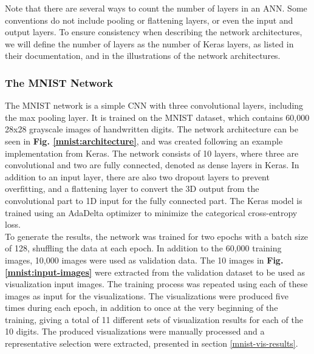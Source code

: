 \noindent Note that there are several ways to count the number of layers in an ANN. Some conventions do not include pooling or flattening layers, or even the input and output layers. To ensure consistency when describing the network architectures, we will define the number of layers as the number of Keras layers, as listed in their documentation, and in the illustrations of the network architectures.

\subsubsection{The MNIST Network}


The MNIST network is a simple CNN with three convolutional layers, including the max pooling layer. It is trained on the MNIST dataset, which contains 60,000 28x28 grayscale images of handwritten digits. The network architecture can be seen in \textbf{Fig. \ref{mnist:architecture}}, and was created following an example implementation from Keras. The network consists of 10 layers, where three are convolutional and two are fully connected, denoted as dense layers in Keras. In addition to an input layer, there are also two dropout layers to prevent overfitting, and a flattening layer to convert the 3D output from the convolutional part to 1D input for the fully connected part. The Keras model is trained using an AdaDelta optimizer to minimize the categorical cross-entropy loss. \\

\noindent To generate the results, the network was trained for two epochs with a batch size of 128, shuffling the data at each epoch. In addition to the 60,000 training images, 10,000 images were used as validation data. The 10 images in \textbf{Fig. \ref{mnist:input-images}} were extracted from the validation dataset to be used as visualization input images. The training process was repeated using each of these images as input for the visualizations. The visualizations were produced five times during each epoch, in addition to once at the very beginning of the training, giving a total of 11 different sets of visualization results for each of the 10 digits. The produced visualizations were manually processed and a representative selection were extracted, presented in section \ref{mnist-vis-results}.

